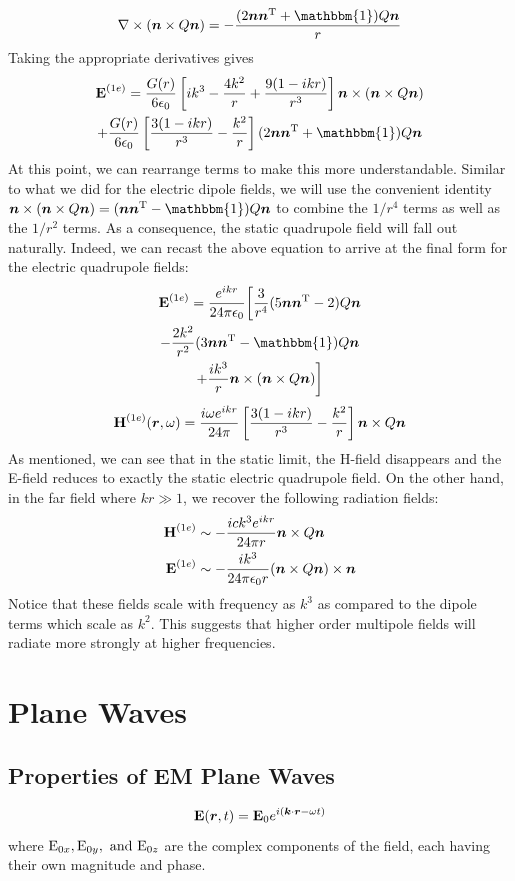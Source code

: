 \documentclass[twocolumn]{gwclass}
\newcommand{\bt}[1]{\text{\textbf{#1}}}
\begin{document}
	$$ \nabla\times(\*n\times Q\*n) = -\frac{(2\*n\*n^\t{T} + \mathbbm{1})Q\*n}{r} $$
	Taking the appropriate derivatives gives
	\begin{multline*} 
	\bt{E}^{(1e)} = \frac{G(r)}{6\epsilon_0}\left[ik^3 - \frac{4k^2}{r} + \frac{9(1-ikr)}{r^3}\right]\*n\times(\*n\times Q\*n) \\
	+ \frac{G(r)}{6\epsilon_0}\left[\frac{3(1-ikr)}{r^3} - \frac{k^2}{r}\right] (2\*n\*n^\t{T} +\mathbbm{1})Q\*n
\end{multline*}
	At this point, we can rearrange terms to make this more understandable. Similar to what we did for the electric dipole fields, we will use the convenient identity $\*n\times(\*n\times Q\*n)=(\*n\*n^\t{T}-\mathbbm{1})Q\*n$ to combine the $1/r^4$ terms as well as the $1/r^2$ terms. As a consequence, the static quadrupole field will fall out naturally. Indeed, we can recast the above equation to arrive at the final form for the electric quadrupole fields:
	\begin{multline*} 
	\bt{E}^{(1e)} = \frac{e^{ikr}}{24\pi\epsilon_0}\bigg[ \frac{3}{r^4} (5\*n\*n^\t{T} - 2)Q\*n \\
	-\frac{2k^2}{r^2}(3\*n\*n^\t{T} - \mathbbm{1})Q\*n\\
	+ \frac{ik^3}{r} \*n\times(\*n\times Q\*n) \bigg] 
\end{multline*}
	$$ \bt{H}^{(1e)}(\*r,\omega) = \frac{i\omega e^{ikr}}{24\pi}\left[\frac{3(1 - ikr)}{r^3} - \frac{k^2}{r} \right]\*n\times Q\*n $$
	As mentioned, we can see that in the static limit, the H-field disappears and the E-field reduces to exactly the static electric quadrupole field. On the other hand, in the far field where $kr\gg 1$, we recover the following radiation fields:
	\begin{align*}
		\bt{H}^{(1e)} &\sim -\frac{ick^3 e^{ikr}}{24\pi r} \*n\times Q\*n \\
		\bt{E}^{(1e)} &\sim -\frac{ik^3}{24\pi \epsilon_0 r} (\*n\times Q\*n)\times\*n
	\end{align*}
	Notice that these fields scale with frequency as $k^3$ as compared to the dipole terms which scale as $k^2$. This suggests that higher order multipole fields will radiate more strongly at higher frequencies. 
	
	\section{Plane Waves}
	\subsection{Properties of EM Plane Waves}
	$$ \bt{E}(\*r,t) = \bt{E}_0 e^{i(\*k\cdot\*r - \omega t)} $$
	where $\text{\normalfont{E}}_{0x}, \text{\normalfont{E}}_{0y}, \text{\normalfont{ and }} \text{\normalfont{E}}_{0z}$ are the complex components of the field, each having their own magnitude and phase. 
\end{document}
